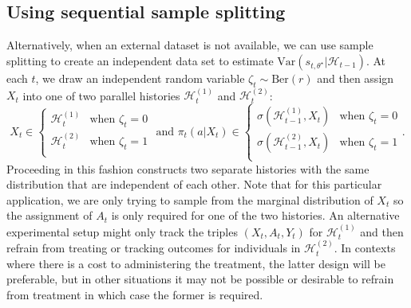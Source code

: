 \documentclass[11pt]{article}
\newcommand{\Hist}{\mathcal{H}}
\newcommand{\Var}{\mathrm{Var}}
\begin{document}
\subsection{Using sequential sample splitting} \label{subsec:sequential}
Alternatively, when an external dataset is not available, we can use sample splitting to create an independent data set to estimate $\Var \left(s_{t,\theta^{\star}} |\Hist_{t-1} \right)$. At each $t$, we draw an independent random variable $\zeta_{t} \sim \text{Ber}(r)$ and then assign $X_t$ into one of two parallel histories $\mathcal{H}_{t}^{(1)}$ and $\mathcal{H}_{t}^{(2)}$: 
$$ X_{t} \in 
\begin{cases}
    \mathcal{H}_{t}^{(1)} & \text{when } \zeta_t = 0 \\
    \mathcal{H}_{t}^{(2)} & \text{when } \zeta_t = 1\\
\end{cases} \text{ and }
\pi_{t}(a |X_{t})  \in 
\begin{cases}
    \sigma(\mathcal{H}_{t-1}^{(1)},X_{t}) & \text{when } \zeta_t = 0 \\
    \sigma(\mathcal{H}_{t-1}^{(2)},X_{t})  & \text{when } \zeta_t = 1\\
\end{cases}.
$$
Proceeding in this fashion constructs two separate histories with the same distribution that are independent of each other. Note that for this particular application, we are only trying to sample from the marginal distribution of $X_{t}$ so the assignment of $A_{t}$ is only required for one of the two histories. An alternative experimental setup might only track the triples $(X_t,A_t,Y_t)$ for $\mathcal{H}_{t}^{(1)}$ and then refrain from treating or tracking outcomes for individuals in $\mathcal{H}_{t}^{(2)}$. In contexts where there is a cost to administering the treatment, the latter design will be preferable, but in other situations it may not be possible or desirable to refrain from treatment in which case the former is required.
\end{document}
